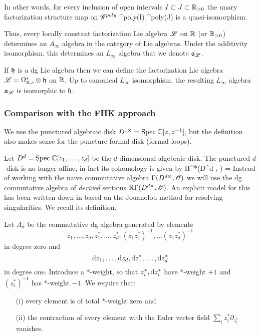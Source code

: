 In other words, for every inclusion of open intervals $I \subset J \subset \mathbb R_{>0}$ the unary factorization structure map on $\mathscr G^{poly}$ 
\ben
\sG^{poly}(I) \xto{\simeq} \sG^{poly}(J)
\een
is a quasi-isomorphism. 


Thus, every locally constant factorization Lie algebra $\mathscr L$ on $\mathbb R$ (or $\mathbb R_{>0}$) determines an $A_\infty$ algebra in the category of Lie algebras. 
Under the additivity isomorphism, this determines an $L_\infty$ algebra that we denote $\mathfrak a_{\mathscr L}$. 

If $\mathfrak h$ is a dg Lie algebra then we can define the factorization Lie algebra $\mathscr L = \Omega^*_{\mathbb R, c} \otimes \mathfrak h$ on $\mathbb R$. 
Up to canonical $L_\infty$ isomorphism, the resulting $L_\infty$ algebra $\mathfrak a_{\mathscr L}$ is isomorphic to $\mathfrak h$. 

\subsubsection{Comparison with the FHK approach}
\label{sec: cf with FHK}

We use the punctured algebraic disk $D^{1\times} = {\rm Spec} \;  \mathbb C [z,z^{-1}]$, but the definition also makes sense for the puncture formal disk (formal loops). 

Let $D^d = {\rm Spec} \; \mathbb C[z_1,\ldots, z_d]$ be the $d$-dimensional algebraic disk.
The punctured $d$-disk is no longer affine, in fact its cohomology is given by
\ben
H^*(D^{d \times}, \sO) = 
\een
Instead of working with the naive commutative algebra $\Gamma(D^{d \times}, \mathscr O)$ we will use the dg commutative algebra of {\em derived} sections $\mathbb R \Gamma(D^{d \times}, \mathscr O)$. 
An explicit model for this has been written down in \cite{FHK} based on the Jouanolou method for resolving singularities. 
We recall its definition.

\begin{dfn} 
Let $A_d$ be the commutative dg algebra generated by elements $$z_1,\ldots,z_d, z_1^*,\ldots,z_d^*, (z_1 z_1^*)^{-1}, \ldots (z_1z_d^*)^{-1}$$ in degree zero and $${\rm d} z_1,\ldots , {\rm d} z_d, {\rm d} z_1^*,\ldots, {\rm d} z_d^*$$ in degree one.
Introduce a $*$-weight, so that $z_i^*, {\rm d} z_i^*$ have $*$-weight $+1$ and $(z_i^*)^{-1}$ has $*$-weight $-1$.
We require that:
\begin{itemize}
\item[(i)] every element is of total $*$-weight zero and
\item[(ii)] the contraction of every element with the Euler vector field $\sum_{i} z_i^* \partial_{z_{i}^*}$ vanishes.
\end{itemize}
\end{dfn}

